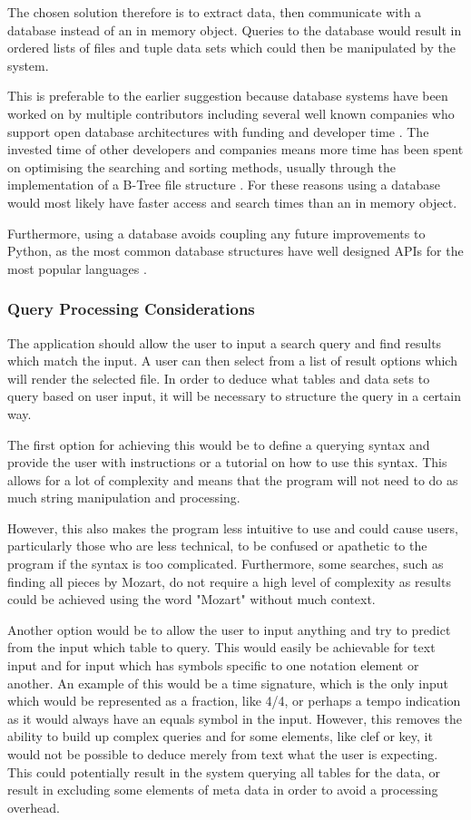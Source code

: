 The chosen solution therefore is to extract data, then communicate with a database instead of an in memory object. Queries to the database would result in ordered lists of files and tuple data sets which could then be manipulated by the system. 

This is preferable to the earlier suggestion because database systems have been worked on by multiple contributors including several well known companies who support open database architectures with funding and developer time \parencite{SQLiteConsortium}. The invested time of other developers and companies means more time has been spent on optimising the searching and sorting methods, usually through the implementation of a B-Tree file structure \parencite{SQLiteBTree}. For these reasons using a database would most likely have faster access and search times than an in memory object.

Furthermore, using a database avoids coupling any future improvements to Python, as the most common database structures have well designed APIs for the most popular languages \parencite{MySQLAPI}.


\subsubsection{Query Processing Considerations}
The application should allow the user to input a search query and find results which match the input. A user can then select from a list of result options which will render the selected file. In order to deduce what tables and data sets to query based on user input, it will be necessary to structure the query in a certain way.

The first option for achieving this would be to define a querying syntax and provide the user with instructions or a tutorial on how to use this syntax. This allows for a lot of complexity and means that the program will not need to do as much string manipulation and processing.

However, this also makes the program less intuitive to use and could cause users, particularly those who are less technical, to be confused or apathetic to the program if the syntax is too complicated. Furthermore, some searches, such as finding all pieces by Mozart, do not require a high level of complexity as results could be achieved using the word "Mozart" without much context.

Another option would be to allow the user to input anything and try to predict from the input which table to query. This would easily be achievable for text input and for input which has symbols specific to one notation element or another. An example of this would be a time signature, which is the only input which would be represented as a fraction, like 4/4, or perhaps a tempo indication as it would always have an equals symbol in the input.
However, this removes the ability to build up complex queries and for some elements, like clef or key, it would not be possible to deduce merely from text what the user is expecting. This could potentially result in the system querying all tables for the data, or result in excluding some elements of meta data in order to avoid a processing overhead.

